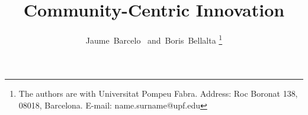 \documentclass[journal]{IEEEtran}
\begin{document}
%
\title{Community-Centric Innovation}
%
%
%

\author{
    Jaume~Barcelo~%
    and~Boris~Bellalta%
\thanks{The authors are with Universitat Pompeu Fabra.\newline
Address: Roc Boronat 138, 08018, Barcelona. \newline
E-mail: {name.surname}@upf.edu }%
}


% 
%



% 
\end{document}

